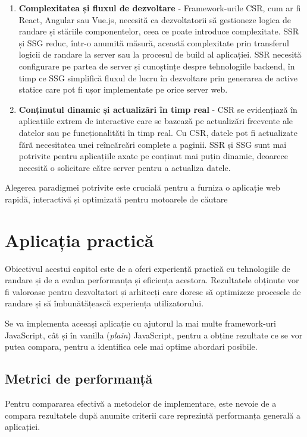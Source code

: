 \documentclass[12pt, a4paper]{report}
\begin{document}
\begin{enumerate}
	\item \textbf{Complexitatea și fluxul de dezvoltare} - Framework-urile CSR, cum ar fi React, Angular sau Vue.js, necesită ca dezvoltatorii să gestioneze logica de randare și stăriile componentelor, ceea ce poate introduce complexitate. SSR și SSG reduc, într-o anumită măsură, această complexitate prin transferul logicii de randare la server sau la procesul de build al aplicației. SSR necesită configurare pe partea de server și cunoștințe despre tehnologiile backend, în timp ce SSG simplifică fluxul de lucru în dezvoltare prin generarea de active statice care pot fi ușor implementate pe orice server web.
	\item \textbf{Conținutul dinamic și actualizări în timp real} - CSR se evidențiază în aplicațiile extrem de interactive care se bazează pe actualizări frecvente ale datelor sau pe funcționalități în timp real. Cu CSR, datele pot fi actualizate fără necesitatea unei re\^inc\u arc\u ari complete a paginii. SSR și SSG sunt mai potrivite pentru aplicațiile axate pe conținut mai puțin dinamic, deoarece necesită o solicitare către server pentru a actualiza datele.
\end{enumerate}

Alegerea paradigmei potrivite este crucială pentru a furniza o aplicație web rapidă, interactivă și optimizat\u a pentru motoarele de c\u autare

\chapter{Aplicația practică}

Obiectivul acestui capitol este de a oferi experiență practică cu tehnologiile de randare și de a evalua performanța și eficiența acestora. Rezultatele obținute vor fi valoroase pentru dezvoltatori și arhitecți care doresc să optimizeze procesele de randare și să îmbunătățească experiența utilizatorului.

Se va implementa aceeași aplicație cu ajutorul la mai multe framework-uri JavaScript, cât și în vanilla (\emph{plain}) JavaScript, pentru a obține rezultate ce se vor putea compara, pentru a identifica cele mai optime abordari posibile.


\section{Metrici de performanță}

Pentru compararea efectivă a metodelor de implementare, este nevoie de a compara rezultatele după anumite criterii care reprezintă performanța generală a aplicației.
\end{document}

